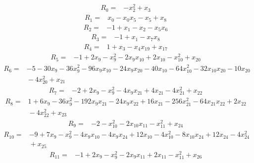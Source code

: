 \begingroup
\small
{}
\setlength{\jot}{3pt}
\begin{align*}
R_{0}={}& -x_{2}^{2} + x_{3}
\end{align*}
\begin{align*}
R_{1}={}& x_{0} - x_{0}x_{5} - x_{5} + x_{8}
\end{align*}
\begin{align*}
R_{2}={}& -1 + x_{1} - x_{2} - x_{5}x_{6}
\end{align*}
\begin{align*}
R_{3}={}& -1 + x_{1} - x_{7}x_{8}
\end{align*}
\begin{align*}
R_{4}={}& 1 + x_{3} - x_{4}x_{19} + x_{17}
\end{align*}
\begin{align*}
R_{5}={}& -1 + 2x_{9} - x_{9}^{2} - 2x_{9}x_{10} + 2x_{10} - x_{10}^{2} + x_{20}
\end{align*}
\begin{align*}
R_{6}={}& -5 - 30x_{9} - 36x_{9}^{2} - 96x_{9}x_{10} - 24x_{9}x_{20} - 40x_{10} - 64x_{10}^{2} - 32x_{10}x_{20} - 10x_{20} \\
&{} - 4x_{20}^{2} + x_{21}
\end{align*}
\begin{align*}
R_{7}={}& -2 + 2x_{9} - x_{9}^{2} - 4x_{9}x_{21} + 4x_{21} - 4x_{21}^{2} + x_{22}
\end{align*}
\begin{align*}
R_{8}={}& 1 + 6x_{9} - 36x_{9}^{2} - 192x_{9}x_{21} - 24x_{9}x_{22} + 16x_{21} - 256x_{21}^{2} - 64x_{21}x_{22} + 2x_{22} \\
&{} - 4x_{22}^{2} + x_{23}
\end{align*}
\begin{align*}
R_{9}={}& -2 - x_{10}^{2} - 2x_{10}x_{11} - x_{11}^{2} + x_{24}
\end{align*}
\begin{align*}
R_{10}={}& -9 + 7x_{9} - x_{9}^{2} - 4x_{9}x_{10} - 4x_{9}x_{24} + 12x_{10} - 4x_{10}^{2} - 8x_{10}x_{24} + 12x_{24} - 4x_{24}^{2} \\
&{} + x_{25}
\end{align*}
\begin{align*}
R_{11}={}& -1 + 2x_{9} - x_{9}^{2} - 2x_{9}x_{11} + 2x_{11} - x_{11}^{2} + x_{26}
\end{align*}
